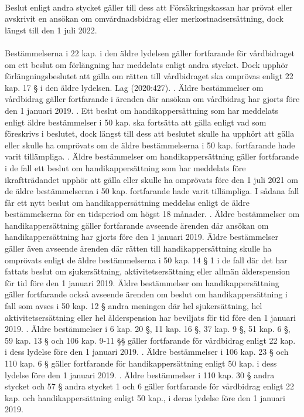 \documentclass[a4paper,notitlepage,openany,10pt]{book}
\begin{document}
\paragraph*{}
Beslut enligt andra stycket gäller till dess att Försäkringskassan har prövat eller avskrivit en ansökan om omvårdnadsbidrag eller merkostnadsersättning, dock längst till den 1 juli 2022.
\paragraph*{}
Bestämmelserna i 22 kap. i den äldre lydelsen gäller fortfarande för vårdbidraget om ett beslut om förlängning har meddelats enligt andra stycket. Dock upphör förlängningsbeslutet att gälla om rätten till vårdbidraget ska omprövas enligt 22 kap. 17 § i den äldre lydelsen.
Lag (2020:427).
. Äldre bestämmelser om vårdbidrag gäller fortfarande i ärenden där ansökan om vårdbidrag har gjorts före den 1 januari 2019.
. Ett beslut om handikappersättning som har meddelats enligt äldre bestämmelser i 50 kap. ska fortsätta att gälla enligt vad som föreskrivs i beslutet, dock längst till dess att beslutet skulle ha upphört att gälla eller skulle ha omprövats om de äldre bestämmelserna i 50 kap. fortfarande hade varit tillämpliga.
. Äldre bestämmelser om handikappersättning gäller fortfarande i de fall ett beslut om handikappersättning som har meddelats före ikraftträdandet upphör att gälla eller skulle ha omprövats före den 1 juli 2021 om de äldre bestämmelserna i 50 kap. fortfarande hade varit tillämpliga. I sådana fall får ett nytt beslut om handikappersättning meddelas enligt de äldre bestämmelserna för en tidsperiod om högst 18 månader.
. Äldre bestämmelser om handikappersättning gäller fortfarande avseende ärenden där ansökan om handikappersättning har gjorts före den 1 januari 2019. Äldre bestämmelser gäller även avseende ärenden där rätten till handikappersättning skulle ha omprövats enligt de äldre bestämmelserna i 50 kap. 14 § 1 i de fall där det har fattats beslut om sjukersättning, aktivitetsersättning eller allmän ålderspension för tid före den 1 januari 2019. Äldre bestämmelser om handikappersättning gäller fortfarande också avseende ärenden om beslut om handikappersättning i fall som avses i 50 kap. 12 § andra meningen där hel sjukersättning, hel aktivitetsersättning eller hel ålderspension har beviljats för tid före den 1 januari 2019.
. Äldre bestämmelser i 6 kap. 20 §, 11 kap. 16 §, 37 kap. 9 §, 51 kap. 6 §, 59 kap. 13 § och 106 kap. 9-11 §§ gäller fortfarande för vårdbidrag enligt 22 kap. i dess lydelse före den 1 januari 2019.
. Äldre bestämmelser i 106 kap. 23 § och 110 kap. 6 § gäller fortfarande för handikappersättning enligt 50 kap. i dess lydelse före den 1 januari 2019.
. Äldre bestämmelser i 110 kap. 30 § andra stycket och 57 § andra stycket 1 och 6 gäller fortfarande för vårdbidrag enligt 22 kap. och handikappersättning enligt 50 kap., i deras lydelse före den 1 januari 2019.
\end{document}
